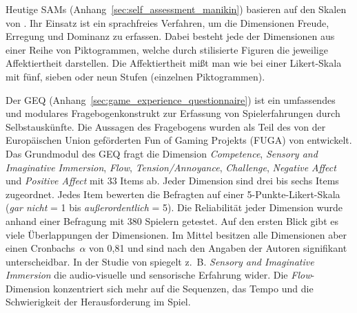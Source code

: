 Heutige \ac{SAM}s (Anhang~\ref{sec:self_assessment_manikin}) basieren auf den Skalen von \citet{Lang1980}. Ihr Einsatz ist ein sprachfreies Verfahren, um die Dimensionen Freude, Erregung und Dominanz zu erfassen. Dabei besteht jede der Dimensionen aus einer Reihe von Piktogrammen, welche durch stilisierte Figuren die jeweilige Affektiertheit darstellen. Die Affektiertheit mißt man wie bei einer Likert-Skala mit fünf, sieben oder neun Stufen (einzelnen Piktogrammen). 

Der \ac{GEQ} (Anhang~\ref{sec:game_experience_questionnaire}) ist ein umfassendes und modulares Fragebogenkonstrukt zur Erfassung von Spielerfahrungen durch Selbstauskünfte. Die Aussagen des Fragebogens wurden als Teil des von der Europäischen Union geförderten Fun of Gaming Projekts (FUGA) von \citet{Ijsselsteijn2008} entwickelt. Das Grundmodul des \ac{GEQ} fragt die Dimension \emph{Competence}, \emph{Sensory and Imaginative Immersion}, \emph{Flow}, \emph{Tension/Annoyance}, \emph{Challenge}, \emph{Negative Affect} und \emph{Positive Affect} mit 33 Items ab. Jeder Dimension sind drei bis sechs Items zugeordnet. Jedes Item bewerten die Befragten auf einer 5-Punkte-Likert-Skala (\emph{gar nicht} = 1 bis \emph{außerordentlich} = 5). Die Reliabilität jeder Dimension wurde anhand einer Befragung mit 380 Spielern getestet. Auf den ersten Blick gibt es viele Überlappungen der Dimensionen. Im Mittel besitzen alle Dimensionen aber einen Cronbachs~$\alpha$ von 0,81 und sind nach den Angaben der Autoren signifikant unterscheidbar. In der Studie von \citet{Nacke2008} spiegelt z.~B. \emph{Sensory and Imaginative Immersion} die audio-visuelle und sensorische Erfahrung wider. Die \emph{Flow}-Dimension konzentriert sich mehr auf die Sequenzen, das Tempo und die Schwierigkeit der Herausforderung im Spiel.

